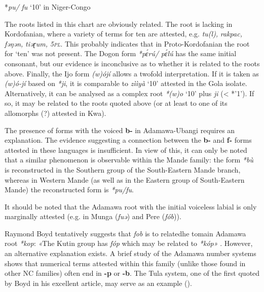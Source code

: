 \begin{table}
\caption{\label{tab:4:38}*\textit{pu/} \textit{fu} `10' in Niger-Congo}
\kppyramid
{}
 
\end{table}
The roots listed in this chart are obviously related. The root is lacking in Kordofanian, where a variety of terms for ten are attested, e.g. \textit{tu(l),} \textit{rakpac,} \textit{fəŋən,} \textit{tiəɽum,} \textit{5\textsc{pl}.} This probably indicates that in Proto-Kordofanian the root for ‘ten’ was not present. The Dogon form \textit{*p{\'{ɛ}}r{\'{u}}/} \textit{p{\'{ɛ}}l{\'{u}}} has the same initial consonant, but our evidence is inconclusive as to whether it is related to the roots above. Finally, the Ijo form \textit{(w)ójí} allows a twofold interpretation. If it is taken as \textit{(w)ó-jí} based on \textit{*ji}, it is comparable to \textit{zììyà} ‘10’ attested in the Gola isolate. Alternatively, it can be analysed as a complex root \textit{*(w)o} ‘10’ plus \textit{ji} (< *’1’). If so, it may be related to the roots quoted above (or at least to one of its allomorphs (?) attested in Kwa).

The presence of forms with the voiced \textbf{b-} in Adamawa-Ubangi requires an explanation. The evidence suggesting a connection between the \textbf{b-} and \textbf{f-} forms attested in these languages is insufficient. In view of this, it can only be noted that a similar phenomenon is observable within the Mande family: the form \textit{*b{\`{u}}} is reconstructed in the Southern group of the South-Eastern Mande branch, whereas in Western Mande (as well as in the Eastern group of South-Eastern Mande) the reconstructed form is \textit{*pu/fu}. 

It should be noted that the Adamawa root with the initial voiceless labial is only marginally attested (e.g. in Munga (\textit{fuə}) and Pere (\textit{fób})).

Raymond Boyd tentatively suggests that \textit{fob} is to relatedhe  tomain Adamawa root \textit{*kop}: \textit{«}The Kutin group has \textit{fóp} which may be related to \textit{*kóp»} \citep[162]{Boyd1989}. However, an alternative explanation exists. A brief study of the Adamawa number systems shows that numerical terms attested within this family (unlike those found in other NC families) often end in \textbf{-p} or \textbf{-b}. The Tula system, one of the first quoted by Boyd in his excellent article, may serve as an example ().

